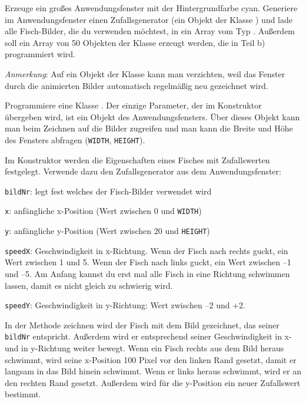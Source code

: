 \begin{compactenum}[a)]
\item Erzeuge ein großes Anwendungsfenster mit der Hintergrundfarbe cyan.
Generiere im Anwendungsfenster einen Zufallsgenerator (ein Objekt der Klasse
) und lade alle Fisch-Bilder, die du verwenden möchtest, in ein
Array vom Typ . Außerdem soll ein Array von 50 Objekten der
Klasse  erzeugt werden, die in Teil b) programmiert wird.

\emph{Anmerkung}: Auf ein Objekt der Klasse  kann man verzichten,
weil das Fenster durch die animierten Bilder automatisch regelmäßig neu
gezeichnet wird.

\item Programmiere eine Klasse . Der einzige Parameter, der im
Konstruktor übergeben wird, ist ein Objekt des Anwendungsfensters. Über dieses
Objekt kann man beim Zeichnen auf die Bilder zugreifen und man kann die Breite
und Höhe des Fensters abfragen (\lstinline|WIDTH|, \lstinline|HEIGHT|).

Im Konstruktor werden die Eigenschaften eines Fisches mit Zufallswerten
festgelegt. Verwende dazu den Zufallsgenerator aus dem Anwendungsfenster:

\begin{compactitem}
\item \lstinline|bildNr|: legt fest welches der Fisch-Bilder verwendet wird
\item \lstinline|x|: anfängliche x-Position (Wert zwischen 0 und
\lstinline|WIDTH|)
\item \lstinline|y|: anfängliche y-Position (Wert zwischen 20 und
\lstinline|HEIGHT|)
\item \lstinline|speedX|: Geschwindigkeit in x-Richtung. Wenn der Fisch nach
rechts guckt, ein Wert zwischen 1 und 5. Wenn der Fisch nach links guckt, ein
Wert zwischen –1 und –5. Am Anfang kannst du erst mal alle Fisch in eine
Richtung schwimmen lassen, damit es nicht gleich zu schwierig wird.
\item \lstinline|speedY|: Geschwindigkeit in y-Richtung: Wert zwischen –2 und
+2.
\end{compactitem}

In der Methode zeichnen wird der Fisch mit dem Bild gezeichnet, das seiner
\lstinline|bildNr| entspricht. Außerdem wird er entsprechend seiner
Geschwindigkeit in x- und in y-Richtung weiter bewegt. Wenn ein Fisch rechts
aus dem Bild heraus schwimmt, wird seine x-Position 100 Pixel vor den linken
Rand gesetzt, damit er langsam in das Bild hinein schwimmt. Wenn er links
heraus schwimmt, wird er an den rechten Rand gesetzt. Außerdem wird für die
y-Position ein neuer Zufallswert bestimmt.
\end{compactenum}


